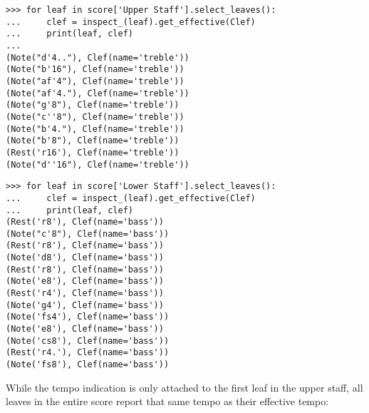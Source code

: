 \begin{abjadbookoutput}
\begin{singlespacing}
\vspace{-0.5\baselineskip}
\begin{verbatim}
>>> for leaf in score['Upper Staff'].select_leaves():
...     clef = inspect_(leaf).get_effective(Clef)
...     print(leaf, clef)
...
(Note("d'4.."), Clef(name='treble'))
(Note("b'16"), Clef(name='treble'))
(Note("af'4"), Clef(name='treble'))
(Note("af'4."), Clef(name='treble'))
(Note("g'8"), Clef(name='treble'))
(Note("c''8"), Clef(name='treble'))
(Note("b'4."), Clef(name='treble'))
(Note("b'8"), Clef(name='treble'))
(Rest('r16'), Clef(name='treble'))
(Note("d''16"), Clef(name='treble'))
\end{verbatim}
\begin{verbatim}
>>> for leaf in score['Lower Staff'].select_leaves():
...     clef = inspect_(leaf).get_effective(Clef)
...     print(leaf, clef)
(Rest('r8'), Clef(name='bass'))
(Note("c'8"), Clef(name='bass'))
(Rest('r8'), Clef(name='bass'))
(Note('d8'), Clef(name='bass'))
(Rest('r8'), Clef(name='bass'))
(Note('e8'), Clef(name='bass'))
(Rest('r4'), Clef(name='bass'))
(Note('g4'), Clef(name='bass'))
(Note('fs4'), Clef(name='bass'))
(Note('e8'), Clef(name='bass'))
(Note('cs8'), Clef(name='bass'))
(Rest('r4.'), Clef(name='bass'))
(Note('fs8'), Clef(name='bass'))
\end{verbatim}
\end{singlespacing}
\end{abjadbookoutput}

\noindent While the tempo indication is only attached to the first leaf in the
upper staff, all leaves in the entire score report that same tempo as their
effective tempo:

\begin{comment}
<abjad>
for leaf in score['Upper Staff'].select_leaves():
    tempo = inspect_(leaf).get_effective(Tempo)
    print(leaf, tempo)

for leaf in score['Lower Staff'].select_leaves():
    tempo = inspect_(leaf).get_effective(Tempo)
    print(leaf, tempo)

</abjad>
\end{comment}

